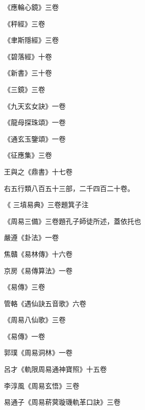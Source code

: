 \begin{pinyinscope}
 《應輪心鏡》三卷



 《秤經》三卷



 《聿斯隱經》三卷



 《碧落經》十卷



 《新書》三十卷



 《三鏡》三卷



 《九天玄女訣》一卷



 《龍母探珠頌》一卷



 《通玄玉鑒頌》一卷



 《征應集》三卷



 王與之《鼎書》十七卷



 右五行類八百五十三部，二千四百二十卷。



 《
 三墳易典》三卷題箕子注



 《周易三備》三卷題孔子師徒所述，蓋依托也



 嚴遵《卦法》一卷



 焦贛《易林傳》十六卷



 京房《易傳算法》一卷



 《易傳》三卷



 管輅《遇仙訣五音歌》六卷



 《周易八仙歌》三卷



 《易傳》一卷



 郭璞《周易洞林》一卷



 呂才《軌限周易通神寶照》十五卷



 李淳風《周易玄悟》三卷



 易通子《周易菥蓂璇璣軌革口訣》三卷




\end{pinyinscope}
